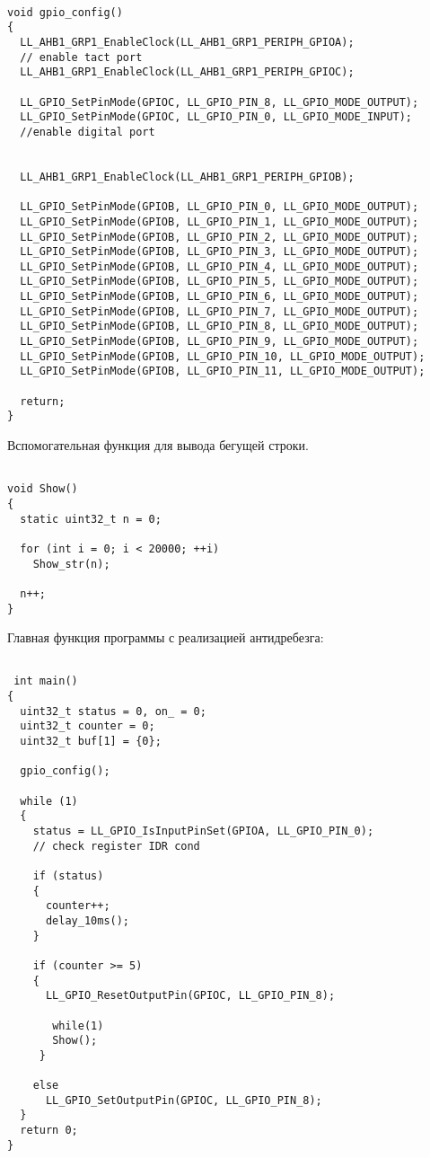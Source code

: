 \begin{verbatim}
    
void gpio_config()
{  
  LL_AHB1_GRP1_EnableClock(LL_AHB1_GRP1_PERIPH_GPIOA); 
  // enable tact port
  LL_AHB1_GRP1_EnableClock(LL_AHB1_GRP1_PERIPH_GPIOC);
  
  LL_GPIO_SetPinMode(GPIOC, LL_GPIO_PIN_8, LL_GPIO_MODE_OUTPUT);
  LL_GPIO_SetPinMode(GPIOC, LL_GPIO_PIN_0, LL_GPIO_MODE_INPUT); 
  //enable digital port

  
  LL_AHB1_GRP1_EnableClock(LL_AHB1_GRP1_PERIPH_GPIOB);
    
  LL_GPIO_SetPinMode(GPIOB, LL_GPIO_PIN_0, LL_GPIO_MODE_OUTPUT);
  LL_GPIO_SetPinMode(GPIOB, LL_GPIO_PIN_1, LL_GPIO_MODE_OUTPUT);
  LL_GPIO_SetPinMode(GPIOB, LL_GPIO_PIN_2, LL_GPIO_MODE_OUTPUT);
  LL_GPIO_SetPinMode(GPIOB, LL_GPIO_PIN_3, LL_GPIO_MODE_OUTPUT);
  LL_GPIO_SetPinMode(GPIOB, LL_GPIO_PIN_4, LL_GPIO_MODE_OUTPUT);
  LL_GPIO_SetPinMode(GPIOB, LL_GPIO_PIN_5, LL_GPIO_MODE_OUTPUT);
  LL_GPIO_SetPinMode(GPIOB, LL_GPIO_PIN_6, LL_GPIO_MODE_OUTPUT);
  LL_GPIO_SetPinMode(GPIOB, LL_GPIO_PIN_7, LL_GPIO_MODE_OUTPUT);
  LL_GPIO_SetPinMode(GPIOB, LL_GPIO_PIN_8, LL_GPIO_MODE_OUTPUT);
  LL_GPIO_SetPinMode(GPIOB, LL_GPIO_PIN_9, LL_GPIO_MODE_OUTPUT);
  LL_GPIO_SetPinMode(GPIOB, LL_GPIO_PIN_10, LL_GPIO_MODE_OUTPUT);
  LL_GPIO_SetPinMode(GPIOB, LL_GPIO_PIN_11, LL_GPIO_MODE_OUTPUT);

  return;
}

\end{verbatim}

Вспомогательная функция для вывода бегущей строки.
\begin{verbatim}
    
void Show()
{
  static uint32_t n = 0;
  
  for (int i = 0; i < 20000; ++i)
    Show_str(n);
  
  n++;
}

\end{verbatim}

Главная функция программы с реализацией антидребезга:

\begin{verbatim}

 int main()
{
  uint32_t status = 0, on_ = 0;
  uint32_t counter = 0;
  uint32_t buf[1] = {0};

  gpio_config();

  while (1)
  {
    status = LL_GPIO_IsInputPinSet(GPIOA, LL_GPIO_PIN_0); 
    // check register IDR cond
 
    if (status)
    {
      counter++; 
      delay_10ms();
    }
        
    if (counter >= 5)
    {
      LL_GPIO_ResetOutputPin(GPIOC, LL_GPIO_PIN_8);
        
       while(1)
       Show();
     }
   
    else
      LL_GPIO_SetOutputPin(GPIOC, LL_GPIO_PIN_8);
  } 
  return 0;
}


\end{verbatim}
